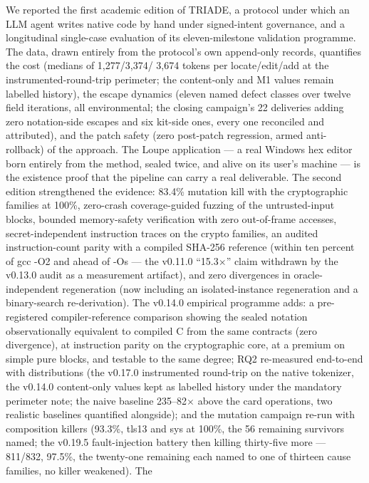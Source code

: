 \documentclass[11pt,a4paper]{article}
\begin{document}
We reported the first academic edition of TRIADE, a protocol under which
an LLM agent writes native code by hand under signed-intent governance,
and a longitudinal single-case evaluation of its eleven-milestone
validation programme. The data, drawn entirely from the protocol's own
append-only records, quantifies the cost (medians of 1{,}277/3{,}374/
3{,}674 tokens per locate/edit/add at the instrumented-round-trip
perimeter; the content-only and M1 values remain labelled history), the
escape dynamics (eleven named defect classes over twelve field
iterations, all environmental; the closing campaign's 22 deliveries
adding zero notation-side escapes and six kit-side ones, every one
reconciled and attributed), and the patch safety (zero
post-patch regression, armed anti-rollback) of the approach. The Loupe
application --- a real Windows hex editor born entirely from the method,
sealed twice, and alive on its user's machine --- is the existence proof
that the pipeline can carry a real deliverable. The second edition strengthened the
evidence: 83.4\% mutation kill with the cryptographic families at
100\%, zero-crash coverage-guided fuzzing of the untrusted-input blocks,
bounded memory-safety verification with zero out-of-frame accesses,
secret-independent instruction traces on the crypto families, an audited
instruction-count parity with a compiled SHA-256 reference (within ten
percent of gcc -O2 and ahead of -Os --- the v0.11.0 ``15.3$\times$''
claim withdrawn by the v0.13.0 audit as a measurement artifact), and zero divergences in oracle-independent regeneration (now including an
isolated-instance regeneration and a binary-search re-derivation). The v0.14.0 empirical programme
adds: a pre-registered compiler-reference comparison showing the sealed
notation observationally equivalent to compiled C from the same contracts
(zero divergence), at instruction parity on the cryptographic core, at a
premium on simple pure blocks, and testable to the same degree; RQ2
re-measured end-to-end with distributions (the v0.17.0 instrumented
round-trip on the native tokenizer, the v0.14.0 content-only values
kept as labelled history under the mandatory perimeter note; the naive
baseline 235--82$\times$ above the card operations, two realistic
baselines quantified alongside); and the mutation campaign re-run with
composition killers (93.3\%, tls13 and sys at 100\%, the 56 remaining
survivors named; the v0.19.5 fault-injection battery then killing
thirty-five more --- 811/832, 97.5\%, the twenty-one remaining each
named to one of thirteen cause families, no killer weakened). The
\end{document}
